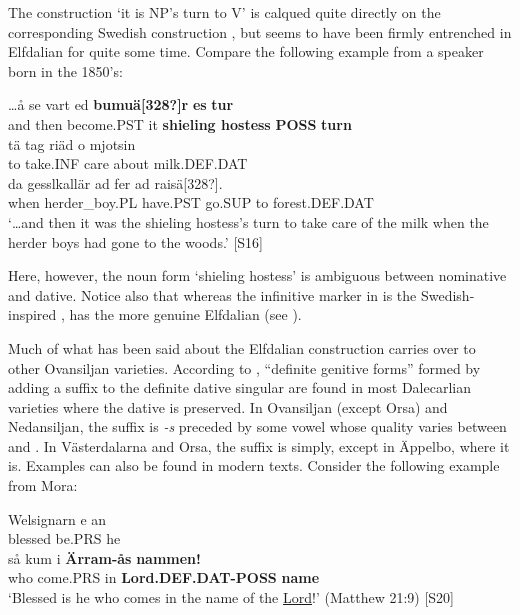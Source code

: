 The construction  ‘it is NP’s turn to V’ is calqued quite directly on the corresponding Swedish construction , but seems to have been firmly entrenched in Elfdalian for quite some time. Compare the following example from a speaker born in the 1850’s:

\ea\label{}
\gll …å  se  vart  ed  \textbf{bumuä[328?]r} \textbf{es} \textbf{tur}\\
and  then  become.PST  it  \textbf{shieling hostess} \textbf{POSS} \textbf{turn}\\
\gll tä  tag  riäd   o  mjotsin\\
to  take.INF  care  about  milk.DEF.DAT\\
\gll da  gesslkallär  ad  fer  ad  raisä[328?].\\
when  herder\_boy.PL  have.PST  go.SUP  to  forest.DEF.DAT\\
\glt ‘…and then it was the shieling hostess’s turn to take care of the milk when the herder boys had gone to the woods.’ [S16]
\z

Here, however, the noun form  ‘shieling hostess’ is ambiguous between nominative and dative. Notice also that whereas the infinitive marker in  is the Swedish-inspired ,  has the more genuine Elfdalian  (see ). 

Much of what has been said about the Elfdalian construction carries over to other Ovansiljan varieties. According to \citet[170]{Levander1928}, “definite genitive forms” formed by adding a suffix to the definite dative singular are found in most Dalecarlian varieties where the dative is preserved. In Ovansiljan (except Orsa) and Nedansiljan, the suffix is\textit{ {}-s} preceded by some vowel whose quality varies between  and . In Västerdalarna and Orsa, the suffix is simply, except in Äppelbo, where it is. Examples can also be found in modern texts. Consider the following example from Mora:

\ea\label{}
\gll Welsignarn  e  an\\
blessed  be.PRS  he\\
\gll så  kum  i  \textbf{Ärram-ås} \textbf{nammen!}\\
who  come.PRS  in  \textbf{Lord.DEF.DAT-POSS} \textbf{name}\\
\glt ‘Blessed is he who comes in the name of the \href{http://www.godrules.net/library/topics/topic1192.htm}{Lord}!’ (Matthew 21:9) [S20]
\z

